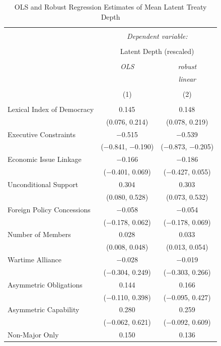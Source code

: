 \documentclass[12pt]{article}
\begin{document}
\begin{table}[!htbp] \centering 
  \caption{OLS and Robust Regression Estimates of Mean Latent Treaty Depth} 
  \label{tab:reg-est-ols} 
\begin{tabular}{@{\extracolsep{5pt}}lcc} 
\\[-1.8ex]\hline 
\hline \\[-1.8ex] 
 & \multicolumn{2}{c}{\textit{Dependent variable:}} \\ 
\cline{2-3} 
\\[-1.8ex] & \multicolumn{2}{c}{Latent Depth (rescaled)} \\ 
\\[-1.8ex] & \textit{OLS} & \textit{robust} \\ 
 & \textit{} & \textit{linear} \\ 
\\[-1.8ex] & (1) & (2)\\ 
\hline \\[-1.8ex] 
 Lexical Index of Democracy & 0.145$^{}$ & 0.148$^{}$ \\ 
  & (0.076, 0.214) & (0.078, 0.219) \\ 
  Executive Constraints & $-$0.515$^{}$ & $-$0.539$^{}$ \\ 
  & ($-$0.841, $-$0.190) & ($-$0.873, $-$0.205) \\ 
  Economic Issue Linkage & $-$0.166 & $-$0.186 \\ 
  & ($-$0.401, 0.069) & ($-$0.427, 0.055) \\ 
  Unconditional Support & 0.304$^{}$ & 0.303$^{}$ \\ 
  & (0.080, 0.528) & (0.073, 0.532) \\ 
  Foreign Policy Concessions & $-$0.058 & $-$0.054 \\ 
  & ($-$0.178, 0.062) & ($-$0.178, 0.069) \\ 
  Number of Members & 0.028$^{}$ & 0.033$^{}$ \\ 
  & (0.008, 0.048) & (0.013, 0.054) \\ 
  Wartime Alliance & $-$0.028 & $-$0.019 \\ 
  & ($-$0.304, 0.249) & ($-$0.303, 0.266) \\ 
  Asymmetric Obligations & 0.144 & 0.166 \\ 
  & ($-$0.110, 0.398) & ($-$0.095, 0.427) \\ 
  Asymmetric Capability & 0.280 & 0.259 \\ 
  & ($-$0.062, 0.621) & ($-$0.092, 0.609) \\ 
  Non-Major Only & 0.150 & 0.136 \\ 

\end{tabular}
\end{table}
\end{document}
